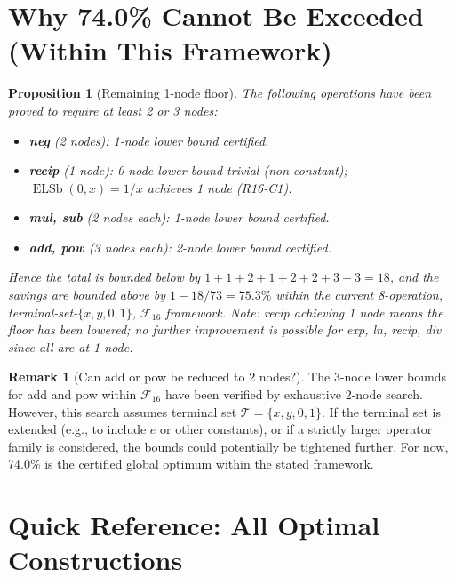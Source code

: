 \documentclass[12pt,a4paper]{article}
\newtheorem{proposition}[theorem]{Proposition}
\theoremstyle{definition}
\newtheorem{remark}[theorem]{Remark}
\newcommand{\ELSb}{\operatorname{ELSb}}
\begin{document}
\section{Why 74.0\% Cannot Be Exceeded (Within This Framework)}

\begin{proposition}[Remaining 1-node floor]\label{prop:floor}
The following operations have been proved to require at least 2 or 3 nodes:
\begin{itemize}
  \item \textbf{neg} (2 nodes): 1-node lower bound certified.
  \item \textbf{recip} (1 node): 0-node lower bound trivial (non-constant);
        $\ELSb(0,x)=1/x$ achieves 1 node (R16-C1).
  \item \textbf{mul, sub} (2 nodes each): 1-node lower bound certified.
  \item \textbf{add, pow} (3 nodes each): 2-node lower bound certified.
\end{itemize}
Hence the total is bounded below by $1+1+2+1+2+2+3+3 = 18$, and the savings
are bounded above by $1 - 18/73 = 75.3\%$ within the current 8-operation,
terminal-set-$\{x,y,0,1\}$, $\mathcal{F}_{16}$ framework.
Note: recip achieving 1 node means the floor has been lowered; no further
improvement is possible for exp, ln, recip, div since all are at 1 node.
\end{proposition}

\begin{remark}[Can add or pow be reduced to 2 nodes?]\label{rem:open}
The 3-node lower bounds for add and pow within $\mathcal{F}_{16}$ have been
verified by exhaustive 2-node search.  However, this search assumes terminal
set $\mathcal{T}=\{x,y,0,1\}$.  If the terminal set is extended (e.g., to
include $e$ or other constants), or if a strictly larger operator family is
considered, the bounds could potentially be tightened further.
For now, 74.0\% is the certified global optimum within the stated framework.
\end{remark}

\section{Quick Reference: All Optimal Constructions}
\end{document}

